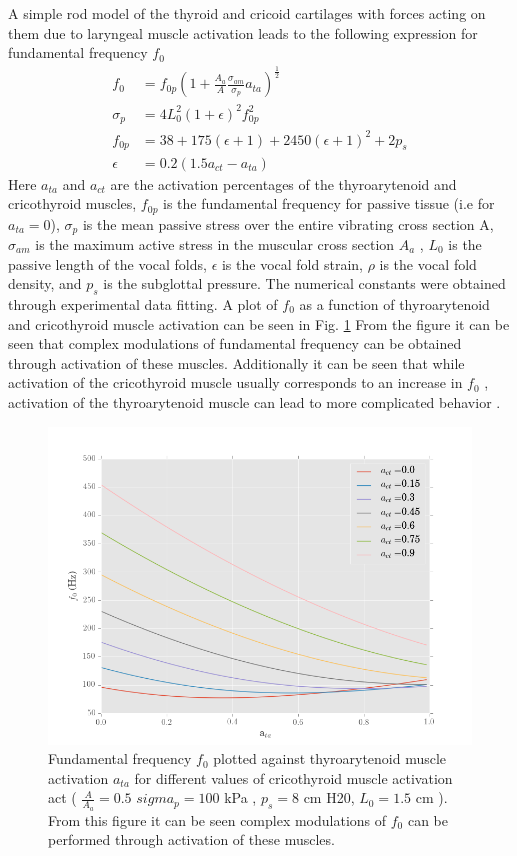 \documentclass[12pt, letter]{report}
\begin{document}
A simple rod model of the thyroid and cricoid cartilages with forces acting on them due to laryngeal muscle activation leads to the following expression for fundamental frequency $f_0$
\begin{equation}
\begin{split}
f_0 &= f_{0p}\left( 1 + \frac{A_a}{A}\frac{\sigma_{am}}{\sigma_p} a_{ta} \right)^\frac{1}{2} \\
\sigma_p &= 4 L_0^2 \left( 1 + \epsilon \right)^2 f_{0p}^2 \\
f_{0p} &= 38 + 175 (\epsilon + 1) + 2450 (\epsilon + 1)^2 + 2 p_s \\
\epsilon &= 0.2 (1.5 a_{ct} - a_{ta}) 
\end{split}
\end{equation}
Here $a_{ta}$ and $a_{ct}$ are the activation percentages of the thyroarytenoid and cricothyroid muscles, $f_{0p}$ is the fundamental frequency for passive tissue (i.e for $a_{ta}=0$), $\sigma_p$ is the mean passive stress over the entire vibrating cross section A, $\sigma_{am}$ is the maximum active stress in the muscular cross section $A_a$ , $L_0$ is the passive length of the vocal folds, $\epsilon$ is the vocal fold strain, $\rho$ is the vocal fold density, and $p_s$ is the subglottal pressure. The numerical constants were obtained through experimental data fitting. A plot of $f_0$ as a function of thyroarytenoid and cricothyroid muscle activation can be seen in Fig. \ref{fig:f0_vs_ata} From the figure it can be seen that complex modulations of fundamental frequency can be obtained through activation of these muscles. Additionally it can be seen that while activation of the cricothyroid muscle usually corresponds to an increase in $f_0$ , activation of the thyroarytenoid muscle can lead to more complicated behavior \cite{Titze1988}.
\begin{figure}
\centering
\includegraphics[width=\linewidth]{f0_vs_ata.png}
\caption{Fundamental frequency $f_0$ plotted against thyroarytenoid muscle activation $a_{ta}$ for different values of cricothyroid muscle activation act ( $\frac{A}{A_a}=0.5$ $sigma_p= 100$ kPa , $p_s = 8 $ cm H20, $L_0 = 1.5$ cm ). From this figure it can be seen complex modulations of $f_0$ can be performed through activation of these muscles. }
\label{fig:f0_vs_ata}
\end{figure}
\end{document}
